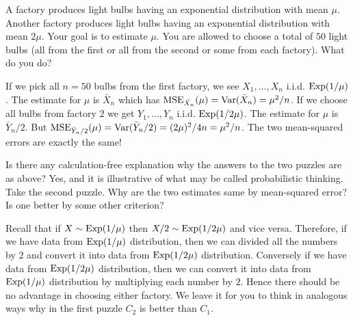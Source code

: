 \documentclass[preprint,  11pt]{amsart}
\begin{document}
 A factory produces light bulbs having an exponential distribution with mean $\mu$. Another factory produces light bulbs having an exponential distribution with mean $2\mu$. Your goal is to estimate $\mu$. You are allowed to choose a total of $50$ light bulbs (all from the first or all from the second or some from each factory). What do you do?

 If we pick all $n=50$ bulbs from the first factory, we see $X_{1},\ldots ,X_{n}$ i.i.d. $\mbox{Exp}(1/\mu)$. The estimate for $\mu$ is $\bar{X}_{n}$ which has $\mbox{MSE}_{\bar{X}_{n}}(\mu)=\mbox{Var}(\bar{X}_{n})=\mu^{2}/n$. If we choose  all bulbs from factory $2$ we get $Y_{1},\ldots ,Y_{n}$ i.i.d. $\mbox{Exp}(1/2\mu)$. The estimate for $\mu$ is $\bar{Y}_{n}/2$. But $\mbox{MSE}_{\bar{Y}_{n}/2}(\mu)=\mbox{Var}(\bar{Y}_{n}/2)=(2\mu)^{2}/4n=\mu^{2}/n$. The two mean-squared errors are exactly the same!

 Is there any calculation-free explanation why the answers to the two puzzles are as above? Yes, and it is illustrative of what may be called probabilistic thinking. Take the second puzzle. Why are the two estimates same by mean-squared error? Is one better by some other criterion?

Recall that if $X\sim \mbox{Exp}(1/\mu)$ then $X/2\sim \mbox{Exp}(1/2\mu)$ and vice versa. Therefore, if we have data from $\mbox{Exp}(1/\mu)$ distribution, then we can divided all the numbers by $2$ and convert it into data from $\mbox{Exp}(1/2\mu)$ distribution. Conversely if we have data from $\mbox{Exp}(1/2\mu)$ distribution, then we can convert it into data from $\mbox{Exp}(1/\mu)$ distribution by multiplying each number by $2$. Hence there should be no advantage in choosing either factory. We leave it for you to think in analogous ways why in the first puzzle $C_{2}$ is better than $C_{1}$.
\end{document}
